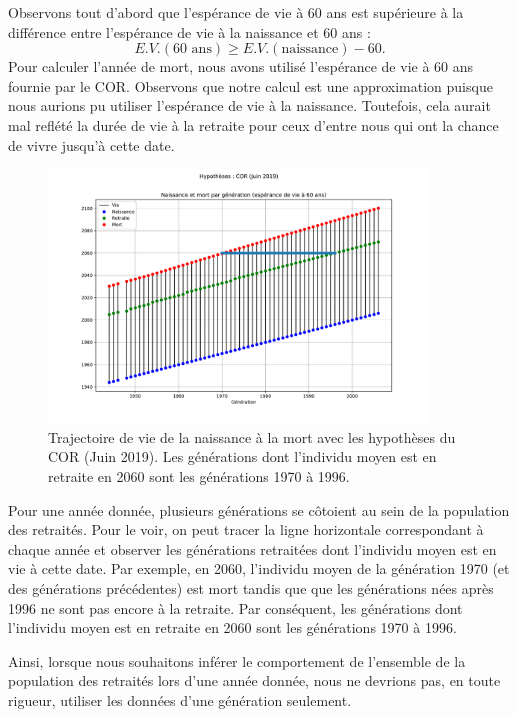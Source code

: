 \documentclass[10pt]{article}
\begin{document}
Observons tout d'abord que l'espérance de vie à 60 ans est supérieure à la 
différence entre l'espérance de vie à la naissance et 60 ans :
$$
E.V.(\textrm{60 ans}) \geq E.V.(\textrm{naissance}) - 60.
$$
Pour calculer l'année de mort, nous avons utilisé l'espérance de vie à 60 ans 
fournie par le COR. 
Observons que notre calcul est une approximation puisque nous aurions pu utiliser 
l'espérance de vie à la naissance. 
Toutefois, cela aurait mal reflété la durée de vie à la retraite pour ceux 
d'entre nous qui ont la chance de vivre jusqu'à cette date. 

\begin{figure}
\begin{center}
\includegraphics[width=0.9\textwidth]{Simulation-generation-vs-annee.pdf}
\end{center}
\caption{Trajectoire de vie de la naissance à la mort avec 
les hypothèses du COR (Juin 2019). 
Les générations dont l'individu moyen est en retraite en 2060 
sont les générations 1970 à 1996. }
\label{fig-trajectoire-vie}
\end{figure}

Pour une année donnée, plusieurs générations se côtoient au sein de la population des retraités. 
Pour le voir, on peut tracer la ligne horizontale correspondant à chaque année et observer les générations retraitées dont l'individu moyen est en vie à cette date. 
Par exemple, en 2060, l'individu moyen de la génération 1970 (et des générations précédentes) est mort tandis que que les générations nées après 1996 ne sont pas encore à la retraite. 
Par conséquent, les générations dont l'individu moyen est en retraite en 2060 sont les générations 1970 à 1996. 

Ainsi, lorsque nous souhaitons inférer le comportement de l'ensemble de la 
population des retraités lors d'une année donnée, nous ne devrions pas, en toute 
rigueur, utiliser les données d'une génération seulement. 
\end{document}
